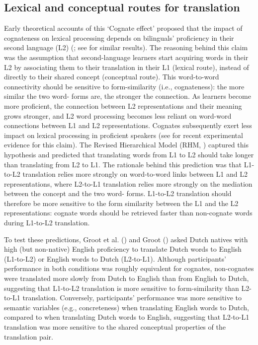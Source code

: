 \documentclass[
]{article}
\begin{document}
\subsection{Lexical and conceptual routes for
translation}\label{lexical-and-conceptual-routes-for-translation}

Early theoretical accounts of this `Cognate effect' proposed that the
impact of cognateness on lexical processing depends on bilinguals'
proficiency in their second language (L2)
(; see
 for similar
results). The reasoning behind this claim was the assumption that
second-language learners start acquiring words in their L2 by
associating them to their translation in their L1 (lexical route),
instead of directly to their shared concept (conceptual route). This
word-to-word connectivity should be sensitive to form-similarity (i.e.,
cognateness): the more similar the two word- forms are, the stronger the
connection. As learners become more proficient, the connection between
L2 representations and their meaning grows stronger, and L2 word
processing becomes less reliant on word-word connections between L1 and
L2 representations. Cognates subsequently exert less impact on lexical
processing in proficient speakers (see
 for recent
experimental evidence for this claim). The Revised Hierarchical Model
(RHM, ) captured
this hypothesis and predicted that translating words from L1 to L2
should take longer than translating from L2 to L1. The rationale behind
this prediction was that L1-to-L2 translation relies more strongly on
word-to-word links between L1 and L2 representations, where L2-to-L1
translation relies more strongly on the mediation between the concept
and the two word- forms. L1-to-L2 translation should therefore be more
sensitive to the form similarity between the L1 and the L2
representations: cognate words should be retrieved faster than
non-cognate words during L1-to-L2 translation.

To test these predictions, Groot et al.
() and Groot
() asked Dutch natives with high
(but non-native) English proficiency to translate Dutch words to English
(L1-to-L2) or English words to Dutch (L2-to-L1). Although participants'
performance in both conditions was roughly equivalent for cognates,
non-cognates were translated more slowly from Dutch to English than from
English to Dutch, suggesting that L1-to-L2 translation is more sensitive
to form-similarity than L2-to-L1 translation. Conversely, participants'
performance was more sensitive to semantic variables (e.g.,
concreteness) when translating English words to Dutch, compared to when
translating Dutch words to English, suggesting that L2-to-L1 translation
was more sensitive to the shared conceptual properties of the
translation pair.
\end{document}
